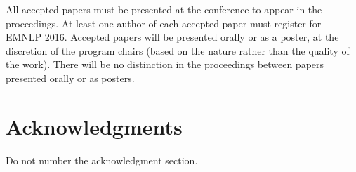 \documentclass[11pt,letterpaper]{article}
\begin{document}
All accepted papers must be presented at the conference to appear in the
proceedings. At least one author of each accepted paper must register for EMNLP
2016. Accepted papers will be presented orally or as a poster, at the discretion
of the program chairs (based on the nature rather than the quality of the work).
There will be no distinction in the proceedings between papers presented orally
or as posters.

\section*{Acknowledgments}

Do not number the acknowledgment section.



\end{document}
